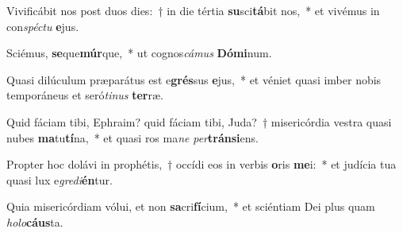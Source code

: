\item Vivificábit nos post duos dies:~† in die tértia \textbf{su}sci\textbf{tá}bit nos,~* et vivémus in con\textit{spéc}\textit{tu} \textbf{e}jus.
\item Sciémus, \textbf{se}que\textbf{múr}que,~* ut cognos\textit{cá}\textit{mus} \textbf{Dó}\textbf{mi}num.
\item Quasi dilúculum præparátus est e\textbf{grés}sus \textbf{e}jus,~* et véniet quasi imber nobis temporáneus et seró\textit{ti}\textit{nus} \textbf{ter}ræ.
\item Quid fáciam tibi, Ephraim? quid fáciam tibi, Juda?~† misericórdia vestra quasi nubes \textbf{ma}tu\textbf{tí}na,~* et quasi ros ma\textit{ne} \textit{per}\textbf{tráns}\textbf{i}ens.
\item Propter hoc dolávi in prophétis,~† occídi eos in verbis \textbf{o}ris \textbf{me}i:~* et judícia tua quasi lux e\textit{gre}\textit{di}\textbf{én}tur.
\item Quia misericórdiam vólui, et non \textbf{sa}cri\textbf{fí}cium,~* et sciéntiam Dei plus quam \textit{ho}\textit{lo}\textbf{cáus}ta.
